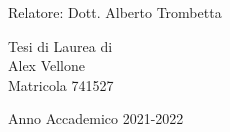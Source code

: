 \begin{titlepage}
\begin{center}
    \vfill
    \vspace{3cm}
    \begin{large}
      Relatore: Dott. Alberto Trombetta

      \vspace{1.0cm}
      Tesi di Laurea di\\
      Alex Vellone\\
      Matricola 741527\\
      \vspace{0.5cm}

    \end{large}

    Anno Accademico 2021-2022

  \end{center}
\end{titlepage}
